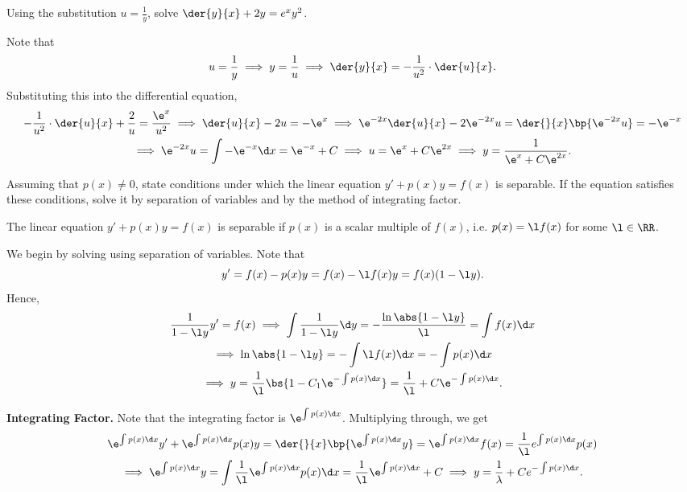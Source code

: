 \begin{problem}
    Using the substitution $u = \frac1y$, solve $\der{y}{x} + 2y = e^x y^2$.
\end{problem}
\begin{solution}
    Note that \[u = \frac1y \implies y = \frac1u \implies \der{y}{x} = -\frac1{u^2} \cdot \der{u}{x}.\] Substituting this into the differential equation,
    \begin{gather*}
        -\frac1{u^2} \cdot \der{u}{x} + \frac2{u} = \frac{\e^x}{u^2} \implies \der{u}{x} -2u = -\e^x \implies \e^{-2x}\der{u}{x} - 2\e^{-2x} u = \der{}{x} \bp{\e^{-2x} u} = -\e^{-x}\\
        \implies \e^{-2x} u = \int -\e^{-x} \d x = \e^{-x} + C \implies u = \e^x + C\e^{2x} \implies y = \frac{1}{\e^x + C\e^{2x}}.
    \end{gather*}
\end{solution}

\begin{problem}
    Assuming that $p(x) \neq 0$, state conditions under which the linear equation $y' + p(x) y = f(x)$ is separable. If the equation satisfies these conditions, solve it by separation of variables and by the method of integrating factor.
\end{problem}
\begin{solution}
    The linear equation $y' + p(x) y = f(x)$ is separable if $p(x)$ is a scalar multiple of $f(x)$, i.e. $p(x) = \l f(x)$ for some $\l \in \RR$.

    We begin by solving using separation of variables. Note that \[y' = f(x) - p(x) y = f(x) - \l f(x) y = f(x) 
    (1 - \l y).\] Hence,
    \begin{gather*}
        \frac1{1 - \l y} y' = f(x) \implies \int \frac{1}{1 - \l y} \d y = -\frac{\ln \abs{1 - \l y}}\l = \int f(x) \d x \\
        \implies \ln \abs{1 - \l y} = -\int \l f(x) \d x = -\int p(x) \d x \\
        \implies y = \frac1\l \bs{{1 - C_1\e^{-\int p(x) \d x}}} = \frac1{\l} + C\e^{-\int p(x) \d x}.
    \end{gather*}

    \textbf{Integrating Factor.} Note that the integrating factor is $\e^{\int p(x) \d x}$. Multiplying through, we get
    \begin{gather*}
        \e^{\int p(x) \d x}y' + \e^{\int p(x) \d x} p(x) y = \der{}{x} \bp{\e^{\int p(x) \d x} y} = \e^{\int p(x) \d x} f(x) = \frac1{\l} e^{\int p(x) \d x} p(x)\\
        \implies \e^{\int p(x) \d x} y = \int \frac1{\l} \e^{\int p(x) \d x} p(x) \d x = \frac1{\l} \e^{\int p(x) \d x} + C \implies y = \frac1{\lambda} + Ce^{-\int p(x) \d x}.
    \end{gather*}
\end{solution}

